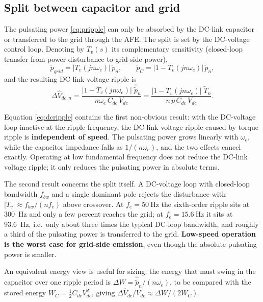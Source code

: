 \documentclass[11pt,a4paper]{article}
\begin{document}
\subsection{Split between capacitor and grid}

The pulsating power \eqref{eq:pripple} can only be absorbed by the DC-link
capacitor or transferred to the grid through the AFE. The split is set by the
DC-voltage control loop. Denoting by $T_{v}(s)$ its complementary sensitivity
(closed-loop transfer from power disturbance to grid-side power),
\begin{equation}
\tilde{p}_{grid}=|T_{v}(jn\omega_{e})|\,\tilde{p}_{n},
\qquad
\tilde{p}_{C}=|1-T_{v}(jn\omega_{e})|\,\tilde{p}_{n},
\end{equation}
and the resulting DC-link voltage ripple is
\begin{equation}
\Delta\hat{V}_{dc,n}
=\frac{|1-T_{v}(jn\omega_{e})|\;\hat{\tilde{p}}_{n}}{n\omega_{e}\,C_{dc}\,V_{dc}}
=\frac{|1-T_{v}(jn\omega_{e})|\;\tilde{T}_{n}}{n\,p\,C_{dc}\,V_{dc}} .
\label{eq:dcripple}
\end{equation}

Equation \eqref{eq:dcripple} contains the first non-obvious result: with the
DC-voltage loop inactive at the ripple frequency, the DC-link voltage ripple
caused by torque ripple is \textbf{independent of speed}. The pulsating power
grows linearly with $\omega_{e}$, while the capacitor impedance falls as
$1/(n\omega_{e})$, and the two effects cancel exactly. Operating at low
fundamental frequency does not reduce the DC-link voltage ripple; it only
reduces the pulsating power in absolute terms.

The second result concerns the split itself. A DC-voltage loop with closed-loop
bandwidth $f_{bw}$ and a single dominant pole rejects the disturbance with
$|T_{v}|\approx f_{bw}/(nf_{e})$ above crossover. At $f_{e}=\SI{50}{\hertz}$ the
sixth-order ripple sits at \SI{300}{\hertz} and only a few percent reaches the
grid; at $f_{e}=\SI{15.6}{\hertz}$ it sits at \SI{93.6}{\hertz}, i.e.\ only about
three times the typical DC-loop bandwidth, and roughly a third of the pulsating
power is transferred to the grid. \textbf{Low-speed operation is the worst case
for grid-side emission}, even though the absolute pulsating power is smaller.

An equivalent energy view is useful for sizing: the energy that must swing in
the capacitor over one ripple period is
$\Delta W = \hat{\tilde{p}}_{n}/(n\omega_{e})$, to be compared with the stored
energy $W_{C}=\tfrac{1}{2}C_{dc}V_{dc}^{2}$, giving
$\Delta \hat{V}_{dc}/V_{dc}\approx \Delta W/(2W_{C})$.
\end{document}
